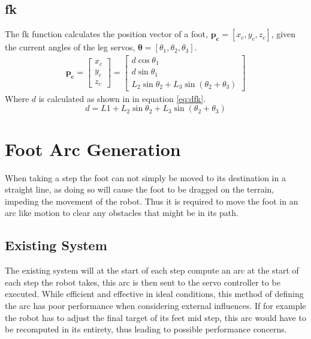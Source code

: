     \subsection{\acf{fk}}
        The \ac{fk} function calculates the position vector of a foot, \(\boldsymbol{p_c} = [x_c,y_c,z_c]\),
        given the current angles of the leg servos, \(\boldsymbol{\theta} = [\theta_1, \theta_2, \theta_3]\).
        \begin{align}
            \boldsymbol{p_c} =
                            \begin{bmatrix}
                                x_c\\
                                y_c\\
                                z_c
                            \end{bmatrix}
                            =
                            \begin{bmatrix}
                                d\cos{\theta_1}\\
                                d\sin{\theta_1}\\
                                L_2\sin{\theta_2} + L_3\sin{\left(\theta_2 + \theta_3\right)}
                            \end{bmatrix}
        \end{align}
        Where \(d\) is calculated as shown in in equation \ref{eq:dfk}.
        \begin{equation}\label{eq:dfk}
            d = L1 + L_2\sin{\theta_2} + L_3\sin{(\theta_2 + \theta_3)}
        \end{equation}

\newpage
\section{Foot Arc Generation} \label{sec:arc_generation}
    When taking a step the foot can not simply be moved to its destination in a straight line, as doing so will cause the foot to be dragged on the terrain,
    impeding the movement of the robot. Thus it is required to move the foot in an arc like motion to clear any obstacles that might be in its path.

    \subsection{Existing System}
        The existing system will at the start of each step compute an arc at the start of each step the robot takes, this arc is then sent to the servo controller
        to be executed. While efficient and effective in ideal conditions, this method of defining the arc has poor performance when considering external
        influences. If for example the robot has to adjust the final target of its feet mid step, this arc would have to be recomputed in its entirety,
        thus leading to possible performance concerns.

